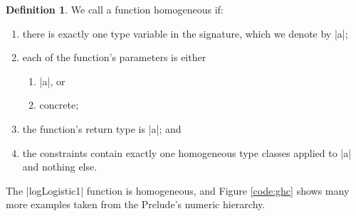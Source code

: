 \documentclass[preprint]{sigplanconf}
\theoremstyle{definition}
\newtheorem{defn}{Definition}
\newcommand{\homoiconic}{{\ttfamily homoiconic}~}
\begin{document}
\begin{defn}
We call a function homogeneous if:
\begin{enumerate}
\item
there is exactly one type variable in the signature, which we denote by |a|;
\item
each of the function's parameters is either
\begin{enumerate}
\item
|a|, or
\item
concrete;
\end{enumerate}
\item
the function's return type is |a|; and
\item
the constraints contain exactly one homogeneous type classes applied to |a| and nothing else.
\end{enumerate}
The |logLogistic1| function is homogeneous,
and Figure \ref{code:ghc} shows many more examples taken from the Prelude's numeric hierarchy.
\end{defn}



\end{document}
